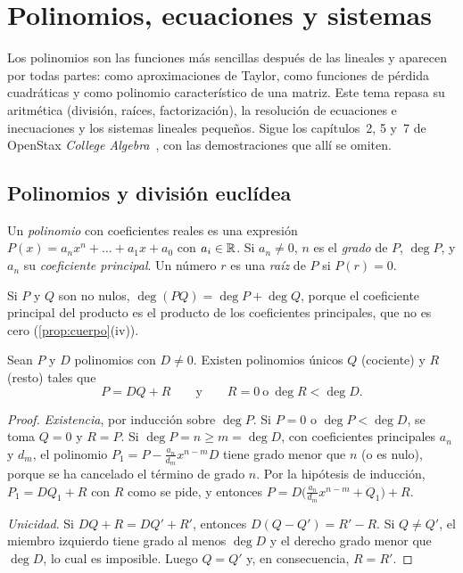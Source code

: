 \chapter{Polinomios, ecuaciones y sistemas}
\label{tema:3}

Los polinomios son las funciones más sencillas después de las lineales y aparecen por todas partes: como aproximaciones de Taylor, como funciones de pérdida cuadráticas y como polinomio característico de una matriz. Este tema repasa su aritmética (división, raíces, factorización), la resolución de ecuaciones e inecuaciones y los sistemas lineales pequeños. Sigue los capítulos~2, 5 y~7 de OpenStax \emph{College Algebra}~\cite{openstax}, con las demostraciones que allí se omiten.

\section{Polinomios y división euclídea}

\begin{definicion}[Polinomio]
Un \emph{polinomio} con coeficientes reales es una expresión $P(x)=a_nx^n+\dots+a_1x+a_0$ con $a_i\in\mathbb{R}$. Si $a_n\neq0$, $n$ es el \emph{grado} de $P$, $\deg P$, y $a_n$ su \emph{coeficiente principal}. Un número $r$ es una \emph{raíz} de $P$ si $P(r)=0$.
\end{definicion}

Si $P$ y $Q$ son no nulos, $\deg(PQ)=\deg P+\deg Q$, porque el coeficiente principal del producto es el producto de los coeficientes principales, que no es cero (\cref{prop:cuerpo}(iv)).

\begin{teorema}\label{teo:division}
Sean $P$ y $D$ polinomios con $D\neq0$. Existen polinomios únicos $Q$ (cociente) y $R$ (resto) tales que
\[
P=DQ+R\qquad\text{y}\qquad R=0\ \text{o}\ \deg R<\deg D.
\]
\end{teorema}

\begin{proof}
\emph{Existencia}, por inducción sobre $\deg P$. Si $P=0$ o $\deg P<\deg D$, se toma $Q=0$ y $R=P$. Si $\deg P=n\ge m=\deg D$, con coeficientes principales $a_n$ y $d_m$, el polinomio $P_1=P-\frac{a_n}{d_m}x^{n-m}D$ tiene grado menor que $n$ (o es nulo), porque se ha cancelado el término de grado $n$. Por la hipótesis de inducción, $P_1=DQ_1+R$ con $R$ como se pide, y entonces $P=D\bigl(\frac{a_n}{d_m}x^{n-m}+Q_1\bigr)+R$.

\emph{Unicidad}. Si $DQ+R=DQ'+R'$, entonces $D(Q-Q')=R'-R$. Si $Q\neq Q'$, el miembro izquierdo tiene grado al menos $\deg D$ y el derecho grado menor que $\deg D$, lo cual es imposible. Luego $Q=Q'$ y, en consecuencia, $R=R'$.
\end{proof}

